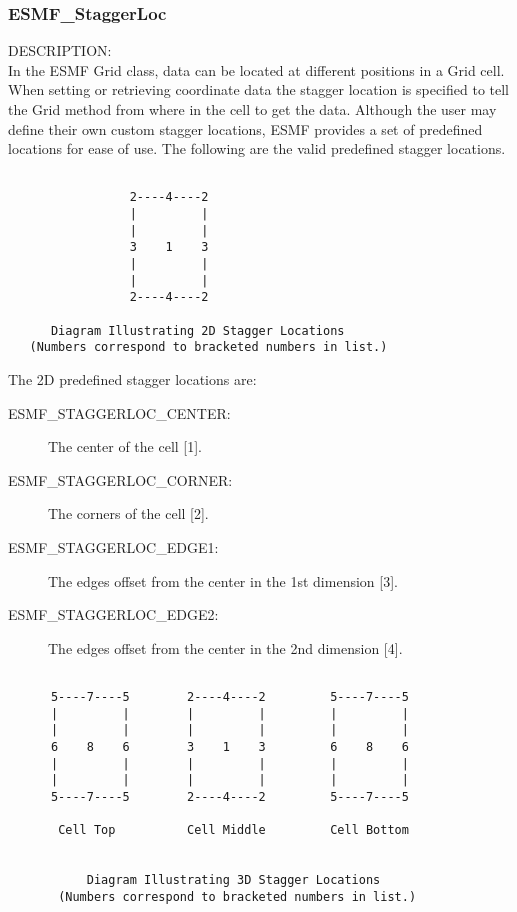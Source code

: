 

 \subsubsection{ESMF\_StaggerLoc}\label{sec:opt:staggerloc}

 {\sf DESCRIPTION:\\}
 In the ESMF Grid class, data can be located at different positions in a
 Grid cell.  When setting or retrieving coordinate data the stagger location is
 specified to tell the Grid method  from where in the cell to get the data. 
 Although the user may define their own custom stagger locations, 
 ESMF provides a set of predefined locations for ease of use. The
following are the valid predefined stagger locations. 

\medskip

\begin{verbatim}
    
                 2----4----2
                 |         |
                 |         |
                 3    1    3
                 |         |
                 |         |
                 2----4----2
 
      Diagram Illustrating 2D Stagger Locations
   (Numbers correspond to bracketed numbers in list.)

\end{verbatim}

The 2D predefined stagger locations are:\\
\begin{description}
\item [ESMF\_STAGGERLOC\_CENTER:] The center of the cell [1].
\item [ESMF\_STAGGERLOC\_CORNER:] The corners of the cell [2].
\item [ESMF\_STAGGERLOC\_EDGE1:] The edges offset from the center in the 1st dimension [3].
\item [ESMF\_STAGGERLOC\_EDGE2:] The edges offset from the center in the 2nd dimension [4].
\end{description}

\medskip

\begin{verbatim}
    
      5----7----5        2----4----2         5----7----5
      |         |        |         |         |         |
      |         |        |         |         |         | 
      6    8    6        3    1    3         6    8    6
      |         |        |         |         |         |
      |         |        |         |         |         |
      5----7----5        2----4----2         5----7----5

       Cell Top          Cell Middle         Cell Bottom
         

           Diagram Illustrating 3D Stagger Locations
       (Numbers correspond to bracketed numbers in list.)

\end{verbatim}


